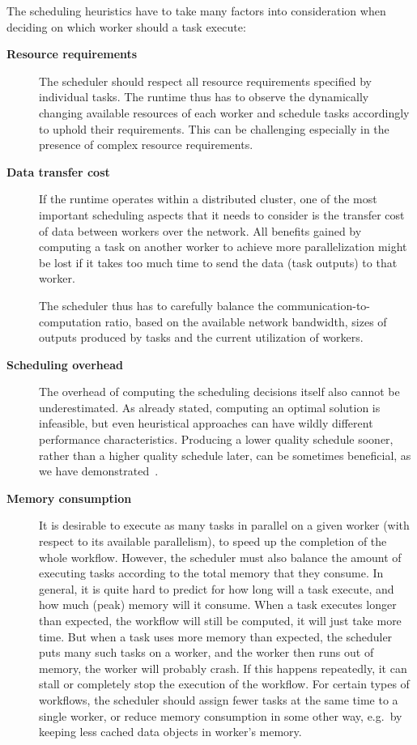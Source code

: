 The scheduling heuristics have to take many factors into consideration when deciding on which
worker should a task execute:

\begin{description}
    \item[\textbf{Resource requirements}] The scheduler should respect all resource requirements specified by individual tasks. The runtime
    thus has to observe the dynamically changing available resources of each worker and schedule tasks
    accordingly to uphold their requirements. This can be challenging especially in the presence of
    complex resource requirements.
    \item[\textbf{Data transfer cost}] If the runtime operates within a distributed cluster, one of the most important scheduling aspects
    that it needs to consider is the transfer cost of data between workers over the network. All
    benefits gained by computing a task on another worker to achieve more parallelization might be lost
    if it takes too much time to send the data (task outputs) to that worker.

    The scheduler thus has to carefully balance the communication-to-computation ratio, based on the
    available network bandwidth, sizes of outputs produced by tasks and the current utilization of
    workers.
    \item[\textbf{Scheduling overhead}] The overhead of computing the scheduling decisions itself also cannot be underestimated. As already
    stated, computing an optimal solution is infeasible, but even heuristical approaches can have
    wildly different performance characteristics. Producing a lower quality schedule sooner, rather
    than a higher quality schedule later, can be sometimes beneficial, as we have
    demonstrated~\cite{estee, rsds}.
    \item[\textbf{Memory consumption}] It is desirable to execute as many tasks in parallel on a given worker (with respect to its
    available parallelism), to speed up the completion of the whole workflow. However, the scheduler
    must also balance the amount of executing tasks according to the total memory that they consume. In
    general, it is quite hard to predict for how long will a task execute, and how much (peak) memory
    will it consume. When a task executes longer than expected, the workflow will still be computed, it
    will just take more time. But when a task uses more memory than expected, the scheduler puts many
    such tasks on a worker, and the worker then runs out of memory, the worker will probably crash. If
    this happens repeatedly, it can stall or completely stop the execution of the workflow. For certain
    types of workflows, the scheduler should assign fewer tasks at the same time to a single worker, or
    reduce memory consumption in some other way, e.g.\ by keeping less cached data objects in worker's
    memory.
\end{description}
